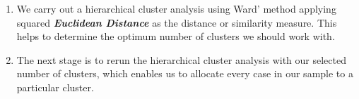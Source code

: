 \documentclass[a4paper,12pt]{article}
\begin{document}
\begin{enumerate}
\item We carry out a hierarchical cluster analysis using Ward' method applying squared
\textit{\textbf{Euclidean Distance}} as the distance or similarity measure. This helps to determine the
optimum number of clusters we should work with.
\item The next stage is to rerun the hierarchical cluster analysis with our selected number
of clusters, which enables us to allocate every case in our sample to a particular
cluster.
\end{enumerate}

\end{document}
